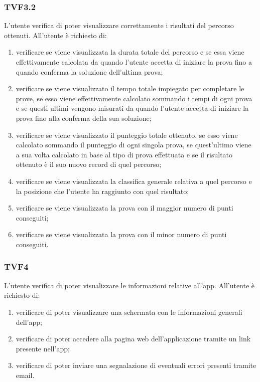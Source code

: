 		\subsubsection{TVF3.2}
			L'utente verifica di poter visualizzare correttamente i risultati del percorso ottenuti.
			All'utente è richiesto di:
			\begin{enumerate}
				\item verificare se viene visualizzata la durata totale del percorso e se essa viene effettivamente calcolata da quando l'utente accetta di iniziare la prova fino a quando conferma la soluzione dell'ultima prova;
				\item verificare se viene visualizzato il tempo totale impiegato per completare le prove, se esso viene effettivamente calcolato sommando i tempi di ogni prova e se questi ultimi vengono misurati da quando l'utente accetta di iniziare la prova fino alla conferma della sua soluzione;
				\item verificare se viene visualizzato il punteggio totale ottenuto, se esso viene calcolato sommando il punteggio di ogni singola prova, se quest'ultimo viene a sua volta calcolato in base al tipo di prova effettuata e se il risultato ottenuto è il suo nuovo record di quel percorso;
				\item verificare se viene visualizzata la classifica generale relativa a quel percorso e la posizione che l'utente ha raggiunto con quel risultato;
				\item verificare se viene visualizzata la prova con il maggior numero di punti conseguiti;
				\item verificare se viene visualizzata la prova con il minor numero di punti conseguiti.
			\end{enumerate}
		\subsubsection{TVF4}
			L'utente verifica di poter visualizzare le informazioni relative all'app.
			All'utente è richiesto di:
			\begin{enumerate}
				\item verificare di poter visualizzare una schermata con le informazioni generali dell'app;
				\item verificare di poter accedere alla pagina web dell'applicazione tramite un link presente nell'app;
				\item verificare di poter inviare una segnalazione di eventuali errori presenti tramite email.
			\end{enumerate}
